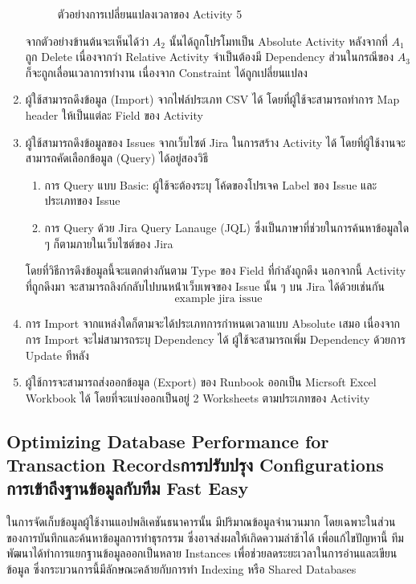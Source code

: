 \begin{enumerate}
\begin{figure} [H]
\begin{center}
        \scalebox{2}{$\Downarrow$}


        \end{center}
        \caption[ตัวอย่างการเปลี่ยนแปลงเวลาของ Activity 5]{ตัวอย่างการเปลี่ยนแปลงเวลาของ Activity 5}
        \label{fig:update activity example 5}
    \end{figure}
    จากตัวอย่างข้านต้นจะเห็นได้ว่า $A_2$ นั้นได้ถูกโปรโมทเป็น Absolute Activity หลังจากที่ $A_1$ ถูก Delete เนื่องจากว่า Relative Activity จำเป็นต้องมี Dependency ส่วนในกรณีของ $A_3$ ก็จะถูกเลื่อนเวลาการทำงาน เนื่องจาก Constraint ได้ถูกเปลี่ยนแปลง
    \item ผู้ใช้สามารถดึงข้อมูล (Import) จากไฟล์ประเภท CSV ได้ โดยที่ผู้ใช้จะสามารถทำการ Map header ให้เป็นแต่ละ Field ของ Activity
    \item ผู้ใช้สามารถดึงข้อมูลของ Issues จากเว็บไซต์ Jira ในการสร้าง​ Activity ได้ โดยที่ผู้ใช้งานจะสามารถคัดเลือกข้อมูล (Query) ได้อยู่สองวิธี
    \begin{enumerate}
        \item การ Query แบบ Basic: ผู้ใช้จะต้องระบุ โค้ดของโปรเจค Label ของ Issue และ ประเภทของ Issue
        \item การ Query ด้วย Jira Query Lanauge (JQL) ซึ่งเป็นภาษาที่ช่วยในการค้นหาข้อมูลใด ๆ ก็ตามภายในเว็บไซต์ของ Jira
    \end{enumerate}
    โดยที่วิธีการดึงข้อมูลนี้จะแตกต่างกันตาม Type ของ Field ที่กำลังถูกดึง นอกจากนี้ Activity ที่ถูกดึงมา จะสามารถลิงก์กลับไปบนหน้่าเว็บเพจของ Issue นั้น ๆ บน Jira ได้ด้วยเช่นกัน
    \[\text{example jira issue}\]
    \item การ Import จากแหล่งใดก็ตามจะได้ประเภทการกำหนดเวลาแบบ Absolute เสมอ เนื่องจากการ Import จะไม่สามารถระบุ Dependency ได้ ผู้ใช้จะสามารถเพิ่ม Dependency ด้วยการ Update ทีหลัง
    \item ผู้ใช้การจะสามารถส่งออกข้อมูล (Export) ของ Runbook ออกเป็น Micrsoft Excel Workbook ได้ โดยที่จะแบ่งออกเป็นอยู่ 2 Worksheets ตามประเภทของ Activity

\end{enumerate}

\subsection{\ifenglish Optimizing Database Performance for Transaction Records\else การปรับปรุง Configurations การเข้าถึงฐานข้อมูลกับทีม Fast Easy\fi}
ในการจัดเก็บข้อมูลผู้ใช้งานแอปพลิเคชันธนาคารนั้น มีปริมาณข้อมูลจำนวนมาก โดยเฉพาะในส่วนของการบันทึกและค้นหาข้อมูลการทำธุรกรรม ซึ่งอาจส่งผลให้เกิดความล่าช้าได้ เพื่อแก้ไขปัญหานี้ ทีมพัฒนาได้ทำการแยกฐานข้อมูลออกเป็นหลาย Instances เพื่อช่วยลดระยะเวลาในการอ่านและเขียนข้อมูล ซึ่งกระบวนการนี้มีลักษณะคล้ายกับการทำ Indexing หรือ Shared Databases


